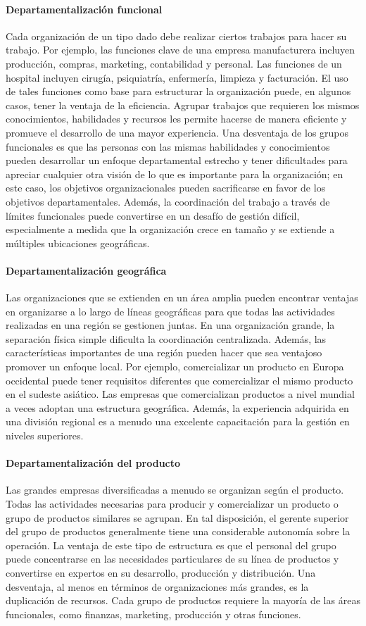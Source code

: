 \documentclass[10pt]{book}
\begin{document}
\paragraph{Departamentalización funcional}
Cada organización de un tipo dado debe realizar ciertos trabajos para hacer su trabajo. Por ejemplo, las funciones clave de una empresa manufacturera incluyen producción, compras, marketing, contabilidad y personal. Las funciones de un hospital incluyen cirugía, psiquiatría, enfermería, limpieza y facturación. El uso de tales funciones como base para estructurar la organización puede, en algunos casos, tener la ventaja de la eficiencia. Agrupar trabajos que requieren los mismos conocimientos, habilidades y recursos les permite hacerse de manera eficiente y promueve el desarrollo de una mayor experiencia. Una desventaja de los grupos funcionales es que las personas con las mismas habilidades y conocimientos pueden desarrollar un enfoque departamental estrecho y tener dificultades para apreciar cualquier otra visión de lo que es importante para la organización; en este caso, los objetivos organizacionales pueden sacrificarse en favor de los objetivos departamentales. Además, la coordinación del trabajo a través de límites funcionales puede convertirse en un desafío de gestión difícil, especialmente a medida que la organización crece en tamaño y se extiende a múltiples ubicaciones geográficas.
\paragraph{Departamentalización geográfica}
Las organizaciones que se extienden en un área amplia pueden encontrar ventajas en organizarse a lo largo de líneas geográficas para que todas las actividades realizadas en una región se gestionen juntas. En una organización grande, la separación física simple dificulta la coordinación centralizada. Además, las características importantes de una región pueden hacer que sea ventajoso promover un enfoque local. Por ejemplo, comercializar un producto en Europa occidental puede tener requisitos diferentes que comercializar el mismo producto en el sudeste asiático. Las empresas que comercializan productos a nivel mundial a veces adoptan una estructura geográfica. Además, la experiencia adquirida en una división regional es a menudo una excelente capacitación para la gestión en niveles superiores.
\paragraph{Departamentalización del producto}
Las grandes empresas diversificadas a menudo se organizan según el producto. Todas las actividades necesarias para producir y comercializar un producto o grupo de productos similares se agrupan. En tal disposición, el gerente superior del grupo de productos generalmente tiene una considerable autonomía sobre la operación. La ventaja de este tipo de estructura es que el personal del grupo puede concentrarse en las necesidades particulares de su línea de productos y convertirse en expertos en su desarrollo, producción y distribución. Una desventaja, al menos en términos de organizaciones más grandes, es la duplicación de recursos. Cada grupo de productos requiere la mayoría de las áreas funcionales, como finanzas, marketing, producción y otras funciones.
\end{document}
